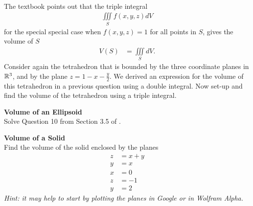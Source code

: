 \BEN
\item %
 \\
The textbook points out that the triple integral 
\begin{align*}
  \iiint\limits_S f(x,y,z) dV
\end{align*}
for the special special case when $f(x,y,z) = 1$ for all points in $S$, gives the volume of $S$
\begin{align*}
  V(S) &= \iiint\limits_S dV.
\end{align*}
Consider again the tetrahedron that is bounded by the three coordinate planes in $\mathbb{R}^3$, and by the plane $z = 1 - x - \frac{y}{2}$. We derived an expression for the volume of this tetrahedron in a previous question using a double integral. Now set-up and find the volume of the tetrahedron using a triple integral.
\item %
\textbf{Volume of an Ellipsoid}\\
Solve Question 10 from Section 3.5 of \VCT.
\item %
\textbf{Volume of a Solid}\\
Find the volume of the solid enclosed by the planes
\begin{align*}
  z & = x+y\\
  y &= x \\
  x &= 0 \\
  z &= -1 \\
  y &= 2
\end{align*}
\textit{Hint: it may help to start by plotting the planes in Google or in Wolfram Alpha.}\\
\EEN %
